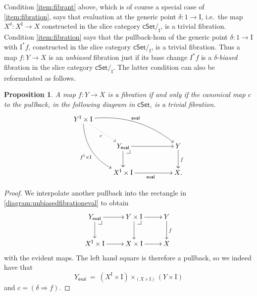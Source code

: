\documentclass[12pt]{article}
\makeatletter
\newcommand{\cSet}{\ensuremath{\mathsf{cSet}}}
\newcommand{\ra}{\ensuremath{\rightarrow}}
\renewcommand{\to}{\ensuremath{\rightarrow}}
\newcommand{\I}{\ensuremath{\mathrm{I}}}
\newtheorem{proposition}[theorem]{Proposition}
\theoremstyle{remark}
\theoremstyle{definition}
\newtheorem{definition}[theorem]{Definition}
\newcommand{\pbcorner}[1][dr]{\save*!/#1-1.2pc/#1:(-1,1)@^{|-}\restore}
\makeatother
\begin{document}
%
Condition \eqref{item:fibrant} above, which is of course a special case of \eqref{item:fibration}, says that evaluation at the generic point $\delta : 1\ra \I$, i.e.\ the map $X^\delta: X^\I \ra X$ constructed in the slice category $\cSet/_\I$, is a trivial fibration.  
Condition \eqref{item:fibration} says that the pullback-hom of the generic point $\delta : 1\ra \I$ with $\I^*f$, constructed in the slice category $\cSet/_\I$, is a trivial fibration.  Thus a map $f: Y\to X$ is an \emph{unbiased} fibration just if its base change $I^*f$  is a $\delta$-\emph{biased} fibration in the slice category $\cSet/_\I$.  The latter condition can also be reformulated as follows.

\begin{proposition}
A map $f : Y\ra X$ is a fibration if and only if the canonical map $c$ to the pullback, in the following diagram in $\cSet$, is a trivial fibration.
\begin{equation}\label{diagram:unbiasedfibrationeval}
\xymatrix{
Y^\I\times \I \ar@/^4ex/ [rrrd]^{\mathsf{eval}} \ar@/_4ex/ [rdd]_{f^\I\times \I} \ar@{..>}[rd]_{c}  && \\
& Y_\mathsf{eval} \pbcorner  \ar[d] \ar[rr] && Y \ar[d]^f \\
& X^\I \times \I \ar[rr]_{\mathsf{eval}} && X.
}
\end{equation}
\end{proposition}
\begin{proof}
We interpolate another pullback into the rectangle in \eqref{diagram:unbiasedfibrationeval} to obtain
\begin{equation}\label{diagram:unbiasedfibrationeval2}
\xymatrix{
 Y_\mathsf{eval} \pbcorner  \ar[d] \ar[r] & Y\times \I \ar[d] \pbcorner \ar[r] & Y \ar[d]^f \\
 X^\I \times \I \ar[r] & X\times \I \ar[r] & X
}
\end{equation}
with the evident maps. The left hand square is therefore a pullback, so we indeed have that 
\[
Y_\mathsf{eval}\ =\ (X^\I \times \I)\times_{(X\times \I)} (Y\times\I)
\]
and $c = (\delta\Rightarrow\! f)$.
\end{proof}
\end{document}
